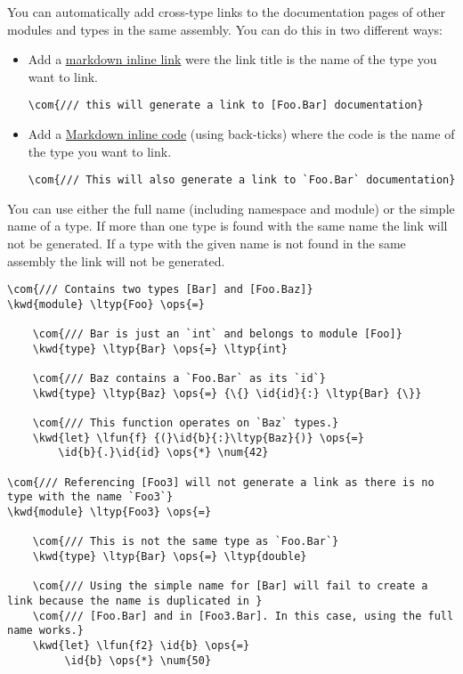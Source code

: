 \documentclass{article}
\newcommand{\id}[1]{\textcolor{black}{#1}}
\newcommand{\com}[1]{\textcolor{officegreen}{#1}}
\newcommand{\kwd}[1]{\textcolor{navy}{#1}}
\newcommand{\num}[1]{\textcolor{officegreen}{#1}}
\newcommand{\ops}[1]{\textcolor{purple}{#1}}
\begin{document}
You can automatically add cross-type links to the documentation pages of other modules and types in the same assembly.
You can do this in two different ways:
\begin{itemize}
\item 

Add a \href{https://github.com/adam-p/markdown-here/wiki/Markdown-Cheatsheet\#links}{markdown inline link} were the link
title is the name of the type you want to link.
\begin{Verbatim}[commandchars=\\\{\}]
\com{/// this will generate a link to [Foo.Bar] documentation}

\end{Verbatim}


\item 

Add a \href{https://github.com/adam-p/markdown-here/wiki/Markdown-Cheatsheet\#code}{Markdown inline code} (using
back-ticks) where the code is the name of the type you want to link.
\begin{Verbatim}[commandchars=\\\{\}]
\com{/// This will also generate a link to `Foo.Bar` documentation}

\end{Verbatim}


\end{itemize}



You can use either the full name (including namespace and module) or the simple name of a type.
If more than one type is found with the same name the link will not be generated.
If a type with the given name is not found in the same assembly the link will not be generated.
\begin{Verbatim}[commandchars=\\\{\}]
\com{/// Contains two types [Bar] and [Foo.Baz]}
\kwd{module} \ltyp{Foo} \ops{=} 
    
    \com{/// Bar is just an `int` and belongs to module [Foo]}
    \kwd{type} \ltyp{Bar} \ops{=} \ltyp{int}
    
    \com{/// Baz contains a `Foo.Bar` as its `id`}
    \kwd{type} \ltyp{Baz} \ops{=} {\{} \id{id}{:} \ltyp{Bar} {\}}

    \com{/// This function operates on `Baz` types.}
    \kwd{let} \lfun{f} {(}\id{b}{:}\ltyp{Baz}{)} \ops{=} 
        \id{b}{.}\id{id} \ops{*} \num{42}

\com{/// Referencing [Foo3] will not generate a link as there is no type with the name `Foo3`}
\kwd{module} \ltyp{Foo3} \ops{=}
    
    \com{/// This is not the same type as `Foo.Bar`}
    \kwd{type} \ltyp{Bar} \ops{=} \ltyp{double}

    \com{/// Using the simple name for [Bar] will fail to create a link because the name is duplicated in }
    \com{/// [Foo.Bar] and in [Foo3.Bar]. In this case, using the full name works.}
    \kwd{let} \lfun{f2} \id{b} \ops{=}
         \id{b} \ops{*} \num{50}
\end{Verbatim}
\end{document}
